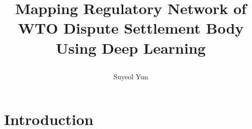\documentclass[12pt,letterpaper]{article}
\newcommand{\tit}{
\bf 
Mapping Regulatory Network of WTO Dispute Settlement Body Using Deep Learning
}
\newcommand\spacingset[1]{\renewcommand{\baselinestretch}
{#1}\small\normalsize}
\begin{document}
\spacingset{1.25}

\setcounter{page}{0}
\vspace{-.1in}

{\title{
    \tit
  }
  \author{Suyeol Yun
  }
  \maketitle
}

\thispagestyle{empty}
\vspace{-.1in}

\begin{abstract}


\end{abstract}

\spacingset{1.5} %

\section{Introduction}




\end{document}
